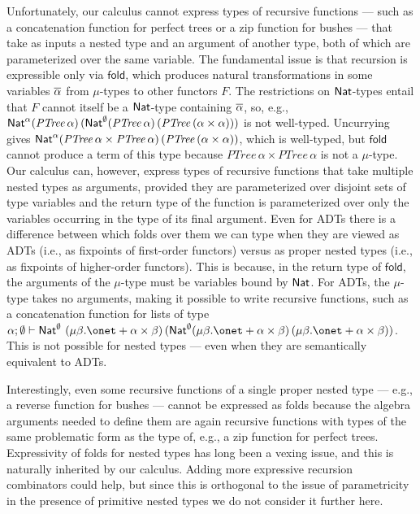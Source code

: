 \documentclass{lmcs}
\theoremstyle{plain}\newtheorem{satz}[thm]{Satz}
\newcommand{\fold}{\mathsf{fold}}
\begin{document}
Unfortunately, our calculus cannot express types of recursive
functions --- such as a concatenation function for perfect trees or a
zip function for bushes --- that take as inputs a nested type and an
argument of another type, both of which are parameterized over the
same variable. The fundamental issue is that recursion is expressible
only via $\fold$, which produces natural transformations in some
variables $\overline{\alpha}$ from $\mu$-types to other functors $F$. The
restrictions on $\mathsf{Nat}$-types entail that $F$ cannot itself be a
$\mathsf{Nat}$-type containing $\overline{\alpha}$, so, e.g., $\mathsf{Nat}^\alpha
(\mathit{PTree}\,\alpha) \,(\mathsf{Nat}^\emptyset (\mathit{PTree}\,\alpha)\,
(\mathit{PTree}\,(\alpha \times \alpha)))$ is not well-typed.
Uncurrying gives $\mathsf{Nat}^\alpha (\mathit{PTree}\,\alpha \times
\mathit{PTree}\,\alpha)\, (\mathit{PTree}\,(\alpha \times \alpha))$,
which is well-typed, but $\mathsf{fold}$ cannot produce a term of this
type because $\mathit{PTree}\,\alpha \times \mathit{PTree}\,\alpha$ is
not a $\mu$-type.  Our calculus can, however, express types of
recursive functions that take multiple nested types as arguments,
provided they are parameterized over disjoint sets of type variables
and the return type of the function is parameterized over only the
variables occurring in the type of its final argument.  Even for ADTs
there is a difference between which folds over them we can type when
they are viewed as ADTs (i.e., as fixpoints of first-order functors)
versus as proper nested types (i.e., as fixpoints of higher-order
functors). This is because, in the return type of $\mathsf{fold}$, the
arguments of the $\mu$-type must be variables bound by $\mathsf{Nat}$.  For
ADTs, the $\mu$-type takes no arguments, making it possible to write
recursive functions, such as a concatenation function for lists of
type $\alpha ; \emptyset \vdash \Nat^\emptyset \ (\mu \beta. \onet +
\alpha \times \beta)\, (\Nat^\emptyset (\mu \beta. \onet + \alpha
\times \beta) \, (\mu \beta. \onet + \alpha \times \beta))$.  This is
not possible for nested types --- even when they are semantically
equivalent to ADTs.

Interestingly, even some recursive functions of a single proper nested
type --- e.g., a reverse function for bushes --- cannot be expressed
as folds because the algebra arguments needed to define them are again
recursive functions with types of the same problematic form as the
type of, e.g., a zip function for perfect trees.  Expressivity of
folds for nested types has long been a vexing issue, and this is
naturally inherited by our calculus.  Adding more expressive recursion
combinators could help, but since this is orthogonal to the issue of
parametricity in the presence of primitive nested types we do not
consider it further here.
\end{document}
